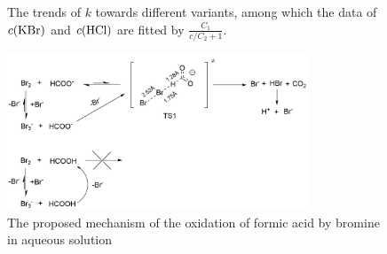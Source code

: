 \documentclass[%
preprint,
 amsmath,amssymb,
 aps,
10.5pt,
]{revtex4-1}
\begin{document}
\begin{figure}
\centering
{}
\caption{The trends of $k$ towards different variants, among which the data of $c(\ce{KBr})$ and $c(\ce{HCl})$ are fitted by $\frac{C_1}{c/C_2 + 1}$.}
\label{fit}
\end{figure}
\begin{figure}
\centering
\includegraphics[width=0.8\textwidth]{figures/reaction_mechanic.png}
\caption{The proposed mechanism of the oxidation of formic acid by bromine in aqueous solution}
\label{mechanism}
\end{figure}
\end{document}
